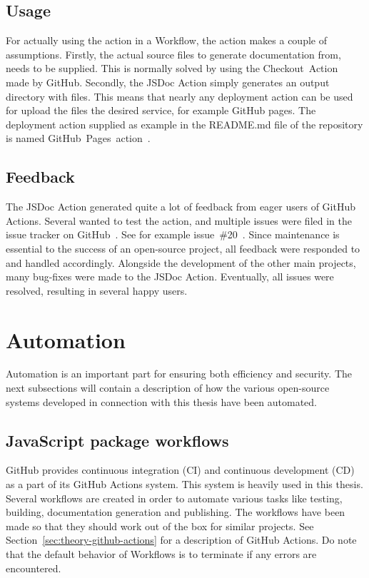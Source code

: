 \subsection{Usage}
For actually using the action in a Workflow, the action makes a couple of assumptions. Firstly, the actual source files to generate documentation from, needs to be supplied. This is normally solved by using the Checkout~Action~\cite{checkout-action} made by GitHub. Secondly, the JSDoc Action simply generates an output directory with files. This means that nearly any deployment action can be used for upload the files the desired service, for example GitHub pages. The deployment action supplied as example in the README.md file of the repository is named GitHub~Pages~action~\cite{github-pages-action}.

\subsection{Feedback}
The JSDoc Action generated quite a lot of feedback from eager users of GitHub Actions. Several wanted to test the action, and multiple issues were filed in the issue tracker on GitHub~\cite{jsdoc-action-issue-tracker}. See for example issue~\#20~\cite{jsdoc-issue-20}. Since maintenance is essential to the success of an open-source project, all feedback were responded to and handled accordingly. Alongside the development of the other main projects, many bug-fixes were made to the JSDoc Action. Eventually, all issues were resolved, resulting in several happy users.

\section{Automation}
\label{sec:method-automation}
Automation is an important part for ensuring both efficiency and security. The next subsections will contain a description of how the various open-source systems developed in connection with this thesis have been automated.

\subsection{JavaScript package workflows}
\label{sec:method-javascript-package-workflows}
GitHub provides continuous integration (CI) and continuous development (CD) as a part of its GitHub Actions system. This system is heavily used in this thesis. Several workflows are created in order to automate various tasks like testing, building, documentation generation and publishing. The workflows have been made so that they should work out of the box for similar projects. See Section~\ref{sec:theory-github-actions} for a description of GitHub Actions. Do note that the default behavior of Workflows is to terminate if any errors are encountered.


